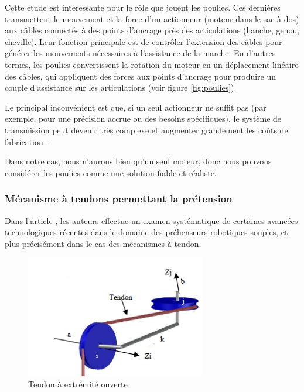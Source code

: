 \documentclass[a4paper, 11pt]{report}
\begin{document}
            Cette étude est intéressante pour le rôle que jouent les poulies. Ces dernières transmettent le mouvement et la force d'un actionneur (moteur dans le sac à dos) aux câbles connectés à des points d'ancrage près des articulations (hanche, genou, cheville). Leur fonction principale est de contrôler l'extension des câbles pour générer les mouvements nécessaires à l'assistance de la marche. En d'autres termes, les poulies convertissent la rotation du moteur en un déplacement linéaire des câbles, qui appliquent des forces aux points d'ancrage pour produire un couple d'assistance sur les articulations (voir figure \ref{fig:poulies}).

            Le principal inconvénient est que, si un seul actionneur ne suffit pas (par exemple, pour une précision accrue ou des besoins spécifiques), le système de transmission peut devenir très complexe et augmenter grandement les coûts de fabrication \cite{daniel_rodriguez-jorge_transmission_2023}.
            
            Dans notre cas, nous n'aurons bien qu'un seul moteur, donc nous pouvons considérer les poulies comme une solution fiable et réaliste.

        \subsubsection{Mécanisme à tendons permettant la prétension}

            Dans l'article \cite{saputro_investigation_2023}, les auteurs effectue un examen systématique de certaines avancées technologiques récentes dans le domaine des préhenseurs robotiques souples, et plus précisément dans le cas des mécanismes à tendon.

            \begin{figure}
                \centering
                \includegraphics[width=0.7\textwidth]{Figures/tendon.png}
                \caption{Tendon à extrémité ouverte \cite{saputro_investigation_2023}}
                \label{fig:tendon}
            \end{figure}
\end{document}
